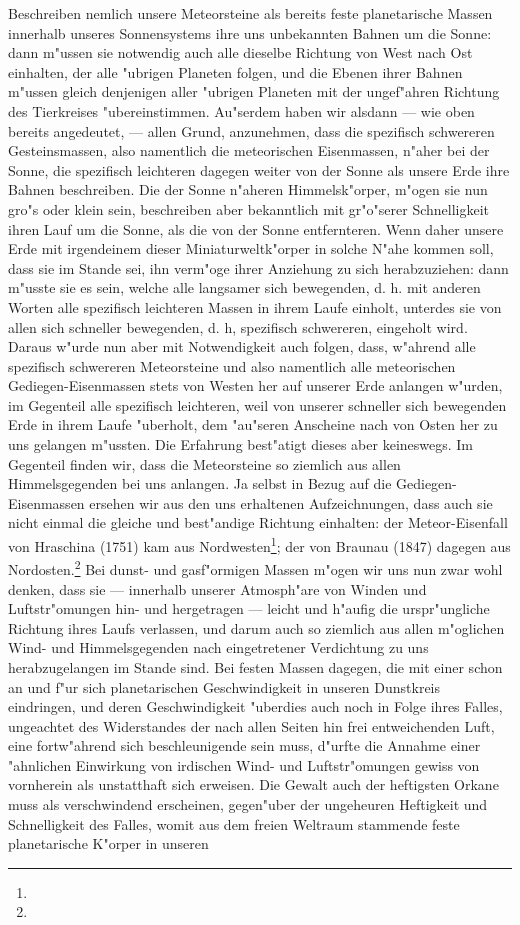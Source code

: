 \documentclass[a4paper, 8pt, oneside, polutonikogreek, german]{article}
\begin{document}
Beschreiben nemlich unsere Meteorsteine als bereits feste planetarische Massen innerhalb unseres Sonnensystems ihre uns unbekannten Bahnen um die Sonne: dann m"ussen sie notwendig auch alle dieselbe Richtung von West nach Ost einhalten, der alle "ubrigen Planeten folgen, und die Ebenen ihrer Bahnen m"ussen gleich denjenigen aller "ubrigen Planeten mit der ungef"ahren Richtung des Tierkreises "ubereinstimmen. Au"serdem haben wir alsdann --- wie oben bereits angedeutet, --- allen Grund, anzunehmen, dass die spezifisch schwereren Gesteinsmassen, also namentlich die meteorischen Eisenmassen, n"aher bei der Sonne, die spezifisch leichteren dagegen weiter von der Sonne als unsere Erde ihre Bahnen beschreiben. Die der Sonne n"aheren Himmelsk"orper, m"ogen sie nun gro"s oder klein sein, beschreiben aber bekanntlich mit gr"o"serer Schnelligkeit ihren Lauf um die Sonne, als die von der Sonne entfernteren. Wenn daher unsere Erde mit irgendeinem dieser Miniaturweltk"orper in solche N"ahe kommen soll, dass sie im Stande sei, ihn verm"oge ihrer Anziehung zu sich herabzuziehen: dann m"usste sie es sein, welche alle langsamer sich bewegenden, d. h. mit anderen Worten alle spezifisch leichteren Massen in ihrem Laufe einholt, unterdes sie von allen sich schneller bewegenden, d. h, spezifisch schwereren, eingeholt wird. Daraus w"urde nun aber mit Notwendigkeit auch folgen, dass, w"ahrend alle spezifisch schwereren Meteorsteine und also namentlich alle meteorischen Gediegen-Eisenmassen stets von Westen her auf unserer Erde anlangen w"urden, im Gegenteil alle spezifisch leichteren, weil von unserer schneller sich bewegenden Erde in ihrem Laufe "uberholt, dem "au"seren Anscheine nach von Osten her zu uns gelangen m"ussten. Die Erfahrung best"atigt dieses aber keineswegs. Im Gegenteil finden wir, dass die Meteorsteine so ziemlich aus allen Himmelsgegenden bei uns anlangen. Ja selbst in Bezug auf die Gediegen-Eisenmassen ersehen wir aus den uns erhaltenen Aufzeichnungen, dass auch sie nicht einmal die gleiche und best"andige Richtung einhalten: der Meteor-Eisenfall von Hraschina (1751) kam aus Nordwesten\footnote{}; der von Braunau (1847) dagegen aus Nordosten.\footnote{} Bei dunst- und gasf"ormigen Massen m"ogen wir uns nun zwar wohl denken, dass sie --- innerhalb unserer Atmosph"are von Winden und Luftstr"omungen hin- und hergetragen --- leicht und h"aufig die urspr"ungliche Richtung ihres Laufs verlassen, und darum auch so ziemlich aus allen m"oglichen Wind- und Himmelsgegenden nach eingetretener Verdichtung zu uns herabzugelangen im Stande sind. Bei festen Massen dagegen, die mit einer schon an und f"ur sich planetarischen Geschwindigkeit in unseren Dunstkreis eindringen, und deren Geschwindigkeit "uberdies auch noch in Folge ihres Falles, ungeachtet des Widerstandes der nach allen Seiten hin frei entweichenden Luft, eine fortw"ahrend sich beschleunigende sein muss, d"urfte die Annahme einer "ahnlichen Einwirkung von irdischen Wind- und Luftstr"omungen gewiss von vornherein als unstatthaft sich erweisen. Die Gewalt auch der heftigsten Orkane muss als verschwindend erscheinen, gegen"uber der ungeheuren Heftigkeit und Schnelligkeit des Falles, womit aus dem freien Weltraum stammende feste planetarische K"orper in unseren 
\end{document}
